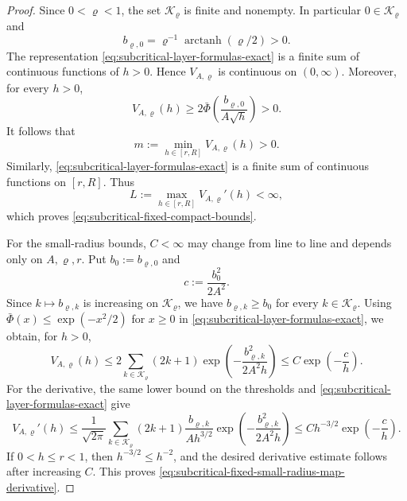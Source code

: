 \documentclass[11pt,reqno,a4paper]{article}
\DeclareMathOperator{\arctanh}{arctanh}
\begin{document}
\begin{proof}
  Since
  $0<\varrho<1$, the set $\mathcal K_\varrho$ is finite and nonempty. In
  particular $0\in\mathcal K_\varrho$ and
  \begin{equation*}
    b_{\varrho,0}
    =
    \varrho^{-1}\arctanh(\varrho/2)
    >0 .
  \end{equation*}
  The representation
  \cref{eq:subcritical-layer-formulas-exact} is a finite sum of
  continuous functions of $h>0$. Hence $V_{A,\varrho}$ is continuous on
  $(0,\infty)$. Moreover, for every $h>0$,
  \begin{equation*}
    V_{A,\varrho}(h)
    \geq
    2\bar\Phi\left(\frac{b_{\varrho,0}}{A\sqrt h}\right)
    >
    0 .
  \end{equation*}
  It follows that
  \begin{equation*}
    m
    :=
    \min_{h\in[r,R]} V_{A,\varrho}(h)
    >
    0 .
  \end{equation*}
  Similarly, \cref{eq:subcritical-layer-formulas-exact} is a finite sum of
  continuous functions on $[r,R]$. Thus
  \begin{equation*}
    L
    :=
    \max_{h\in[r,R]} V_{A,\varrho}'(h)
    <
    \infty ,
  \end{equation*}
  which proves \cref{eq:subcritical-fixed-compact-bounds}.

  For the small-radius bounds, $C<\infty$ may
  change from line to line and depends only on $A,\varrho,r$. Put
  $b_0:=b_{\varrho,0}$ and
  \begin{equation*}
    c:=\frac{b_0^2}{2A^2}.
  \end{equation*}
  Since $k\mapsto b_{\varrho,k}$ is increasing on $\mathcal K_\varrho$, we have
  $b_{\varrho,k}\geq b_0$ for every $k\in\mathcal K_\varrho$. Using
  $\bar\Phi(x)\leq \exp(-x^2/2)$ for $x\geq0$ in
  \cref{eq:subcritical-layer-formulas-exact}, we obtain, for $h>0$,
  \begin{equation*}
    V_{A,\varrho}(h)
    \leq
    2\sum_{k\in\mathcal K_\varrho}(2k+1)
    \exp\left(-\frac{b_{\varrho,k}^2}{2A^2h}\right)
    \leq
    C\exp\left(-\frac c h\right).
  \end{equation*}
  For the derivative, the same lower bound on the thresholds and
  \cref{eq:subcritical-layer-formulas-exact} give
  \begin{equation*}
    V_{A,\varrho}'(h)
    \leq
    \frac1{\sqrt{2\pi}}
    \sum_{k\in\mathcal K_\varrho}
    (2k+1)\frac{b_{\varrho,k}}{Ah^{3/2}}
    \exp\left(-\frac{b_{\varrho,k}^2}{2A^2h}\right)
    \leq
    C h^{-3/2}\exp\left(-\frac c h\right).
  \end{equation*}
  If $0<h\leq r<1$, then $h^{-3/2}\leq h^{-2}$, and the desired derivative
  estimate follows after increasing $C$. This proves
  \cref{eq:subcritical-fixed-small-radius-map-derivative}.
\end{proof}
\end{document}
